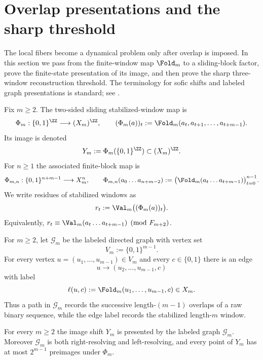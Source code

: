 \section{Overlap presentations and the sharp threshold}\label{sec:stab:conjugacy}

The local fibers become a dynamical problem only after overlap is imposed.  In
this section we pass from the finite-window map $\Fold_m$ to a sliding-block
factor, prove the finite-state presentation of its image, and then prove the
sharp three-window reconstruction threshold.  The terminology for sofic shifts
and labeled graph presentations is standard; see
\cite{LindMarcus1995,Kitchens1998,Nasu1995}.

\begin{definition}\label{def:Phi}
Fix $m\ge 2$.  The two-sided sliding stabilized-window map is
\[
\Phi_m:\{0,1\}^{\ZZ}\longrightarrow (X_m)^{\ZZ},
\qquad
(\Phi_m(a))_t:=\Fold_m(a_t,a_{t+1},\ldots,a_{t+m-1}).
\]
Its image is denoted
\[
Y_m:=\Phi_m(\{0,1\}^{\ZZ})\subset (X_m)^{\ZZ}.
\]
For $n\ge 1$ the associated finite-block map is
\[
\Phi_{m,n}:\{0,1\}^{n+m-1}\longrightarrow X_m^n,
\qquad
\Phi_{m,n}(a_0\ldots a_{n+m-2})
:=
\bigl(\Fold_m(a_t\ldots a_{t+m-1})\bigr)_{t=0}^{n-1}.
\]
We write residues of stabilized windows as
\[
r_t:=\Val_m\bigl((\Phi_m(a))_t\bigr).
\]
Equivalently,
$r_t\equiv\Val_m(a_t\ldots a_{t+m-1})\pmod {F_{m+2}}$.
\end{definition}

\begin{definition}\label{def:overlap-graph}
For $m\ge2$, let $\mathcal G_m$ be the labeled directed graph with vertex set
\[
V_m:=\{0,1\}^{m-1}.
\]
For every vertex $u=(u_1,\ldots,u_{m-1})\in V_m$ and every
$c\in\{0,1\}$ there is an edge
\[
u\longrightarrow (u_2,\ldots,u_{m-1},c)
\]
with label
\[
\ell(u,c):=\Fold_m(u_1,\ldots,u_{m-1},c)\in X_m.
\]
Thus a path in $\mathcal G_m$ records the successive length-$(m-1)$ overlaps
of a raw binary sequence, while the edge label records the stabilized
length-$m$ window.
\end{definition}

\begin{theorem}\label{thm:finite-state-lift}
For every $m\ge2$ the image shift $Y_m$ is presented by the labeled graph
$\mathcal G_m$.  Moreover $\mathcal G_m$ is both right-resolving and
left-resolving, and every point of $Y_m$ has at most $2^{m-1}$ preimages under
$\Phi_m$.
\end{theorem}

